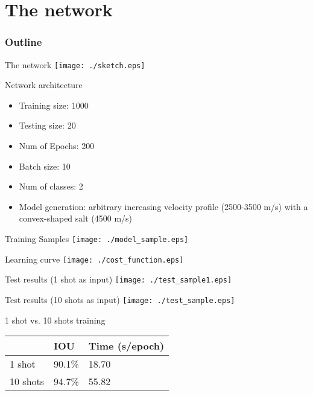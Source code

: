 \documentclass[aspectratio=43]{beamer}
\begin{document}
\section{The network}
\begin{frame}
\frametitle{Outline}
\tableofcontents[currentsection]
\end{frame}
\begin{frame}{The network}
    \texttt{[image: ./sketch.eps]}
\end{frame}
\begin{frame}{Network architecture}
\begin{itemize}
\item{Training size: 1000}
\item{Testing size: 20}
\item{Num of Epochs: 200}
\item{Batch size: 10}
\item{Num of classes: 2}
\item{Model generation: arbitrary increasing velocity profile (2500-3500 m/s) with a convex-shaped salt (4500 m/s)}
\end{itemize}
\end{frame}
\begin{frame}{Training Samples}
    \texttt{[image: ./model\_sample.eps]}
\end{frame}
\begin{frame}{Learning curve}
    \texttt{[image: ./cost\_function.eps]}
\end{frame}
\begin{frame}{Test results (1 shot as input)}
    \texttt{[image: ./test\_sample1.eps]}
\end{frame}
\begin{frame}{Test results (10 shots as input)}
    \texttt{[image: ./test\_sample.eps]}
\end{frame}
\begin{frame}{1 shot vs. 10 shots training}
\begin{table}[]
\centering
\label{my-label}
\begin{tabular}{|l|l|l|}
\hline
         & IOU    & Time (s/epoch) \\ \hline
1 shot   & 90.1\% & 18.70          \\ \hline
10 shots & 94.7\% & 55.82          \\ \hline
\end{tabular}
\end{table}
\end{frame}
\end{document}
